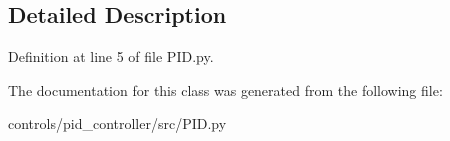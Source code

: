 \subsection{Detailed Description}


Definition at line 5 of file P\+I\+D.\+py.



The documentation for this class was generated from the following file\+:\begin{DoxyCompactItemize}
\item 
controls/pid\+\_\+controller/src/P\+I\+D.\+py\end{DoxyCompactItemize}
